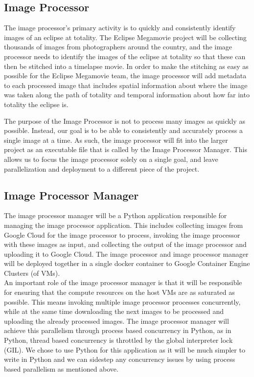\documentclass[10pt, onecolumn, draftclsnofoot, letterpaper, compsoc]{IEEEtran}
\begin{document}
\subsection{Image Processor}

The image processor’s primary activity is to quickly and consistently identify
images of an eclipse at totality. The Eclipse Megamovie project will be
collecting thousands of images from photographers around the country, and the
image processor needs to identify the images of the eclipse at totality so that
these can then be stitched into a timelapse movie. In order to make the
stitching as easy as possible for the Eclipse Megamovie team, the image
processor will add metadata to each processed image that includes spatial
information about where the image was taken along the path of totality and
temporal information about how far into totality the eclipse is.


The purpose of the Image Processor is not to process many images as quickly as
possible. Instead, our goal is to be able to consistently and accurately process
a single image at a time. As such, the image processor will fit into the larger
project as an executable file that is called by the Image Processor Manager.
This allows us to focus the image processor solely on a single goal, and leave
parallelization and deployment to a different piece of the project.

\subsection{Image Processor Manager}

The image processor manager will be a Python application responsible for managing the image processor
application. This includes collecting images from Google Cloud for the image processor to process,
invoking the image processor with these images as input, and collecting the output of the image
processor and uploading it to Google Cloud. The image processor and image processor manager will be
deployed together in a single docker container to Google Container Engine Clusters (of VMs). \\

An important role of the image processor manager is that it will be responsible for ensuring that
the compute resources on the host VMs are as saturated as possible. This means invoking multiple
image processor processes concurrently, while at the same time downloading the next images to be
processed and uploading the already processed images. The image processor manager will achieve
this parallelism through process based concurrency in Python, as in Python, thread based concurrency
is throttled by the global interpreter lock (GIL). We chose to use Python for this application as it
will be much simpler to write in Python and we can sidestep any concurrency issues by using process
based parallelism as mentioned above. \\
\end{document}
